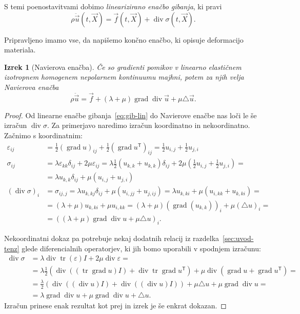 \documentclass[12pt,a4paper,twoside]{article}
\theoremstyle{definition} %
\theoremstyle{plain} %
\newtheorem{izrek}[definicija]{Izrek}
\numberwithin{equation}{section}
\newcommand{\T}{\mathsf{T}}
\newcommand{\lap}{\triangle}
\renewcommand{\div}{\operatorname{div}}
\newcommand{\grad}{\operatorname{grad}}
\newcommand{\eps}{\varepsilon}
\newcommand{\vu}{\vec{u}}
\newcommand{\vf}{\vec{f}}
\newcommand{\vX}{\vec{X}}
\newcommand{\ts}{\sigma}
\DeclareMathOperator{\tr}{tr}
\begin{document}
S temi poenostavitvami dobimo \emph{linearizirano enačbo gibanja}, ki pravi
\begin{equation}
  \rho \ddot{\vu}(t, \vX) = \vf(t, \vX) + \div\sigma(t, \vX).
  \label{eq:gib-lin}
\end{equation}

Pripravljeno imamo vse, da napišemo končno enačbo, ki opisuje deformacijo materiala.
\begin{izrek}[Navierova enačba]
  Če so gradienti pomikov v linearno elastičnem izotropnem homogenem nepolarnem kontinuumu majhni,
  potem za njih velja \emph{Navierova enačba}
  \begin{equation}
    \rho \ddot{\vu} = \vf + (\lambda + \mu)\grad\div \vu + \mu \lap \vu.
    \label{eq:navier}
  \end{equation}
\end{izrek}
\begin{proof}
Od linearne enačbe gibanja~\eqref{eq:gib-lin} do Navierove enačbe nas loči le še
izračun $\div \sigma$. Za primerjavo naredimo izračun koordinatno in
nekoordinatno. Začnimo s koordinatnim:
\begin{align*}
  \eps_{ij} &= \frac12 (\grad u)_{ij} + \frac12 (\grad u^\T)_{ij} =
  \frac12 u_{i,j} + \frac12 u_{j,i} \\
  \ts_{ij} &= \lambda \eps_{kk} \delta_{ij} + 2 \mu \eps_{ij} =
  \lambda \frac{1}{2} (u_{k,k} + u_{k,k}) \delta_{ij} + 2 \mu( \frac12 u_{i,j} +
  \frac12 u_{j,i}) =  \\ &= \lambda u_{k, k}\delta_{ij} + \mu (u_{i,j} +u_{j,i})
  \\
  (\div \ts)_i &= \sigma_{ij,j} = \lambda u_{k, kj}\delta_{ij} + \mu (u_{i,jj}
+u_{j,ij}) = \lambda u_{k,ki} + \mu (u_{i,kk} + u_{k,ki}) = \\
&= (\lambda + \mu)u_{k,ki} + \mu u_{i,kk} = (\lambda+\mu)(\grad(u_{k,k}))_i +
\mu (\lap u)_i = \\ &=
((\lambda + \mu)\grad\div u + \mu \lap u)_i.
\end{align*}

Nekoordinatni dokaz pa potrebuje nekaj dodatnih relacij iz
razdelka~\ref{sec:uvod-tenz} glede diferencialnih operatorjev, ki jih bomo
uporabili v spodnjem izračunu:
\begin{align*}
  \div\ts &= \lambda \div \tr(\eps) I + 2\mu \div \eps = \\ &=
  \lambda \frac12(\div((\tr\grad u)I) + \div\tr\grad u^\T) + \mu \div(\grad u + \grad
  u^\T) = \\
  &= \frac{\lambda}{2} (\div((\div u) I) + \div( (\div u)I)) + \mu \lap u + \mu
  \grad \div u = \\
  &= \lambda \grad \div u + \mu \grad \div u + \lap u.
\end{align*}
Izračun prinese enak rezultat kot prej in izrek je še enkrat dokazan.
\end{proof}
\end{document}
